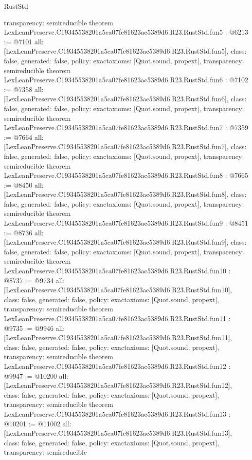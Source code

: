 \begin{lexlean}{RustStd}
\begin{coremodule}
{  transparency: semireducible
}
theorem LexLeanPreserve.C19345538201a5ca07fe81623ac5389d6.R23.RustStd.fun5 : @6213 := @7101 {
  all: [LexLeanPreserve.C19345538201a5ca07fe81623ac5389d6.R23.RustStd.fun5],
  class: false,
  generated: false,
  policy: exact{axioms: [Quot.sound, propext]},
  transparency: semireducible
}
theorem LexLeanPreserve.C19345538201a5ca07fe81623ac5389d6.R23.RustStd.fun6 : @7102 := @7358 {
  all: [LexLeanPreserve.C19345538201a5ca07fe81623ac5389d6.R23.RustStd.fun6],
  class: false,
  generated: false,
  policy: exact{axioms: [Quot.sound, propext]},
  transparency: semireducible
}
theorem LexLeanPreserve.C19345538201a5ca07fe81623ac5389d6.R23.RustStd.fun7 : @7359 := @7664 {
  all: [LexLeanPreserve.C19345538201a5ca07fe81623ac5389d6.R23.RustStd.fun7],
  class: false,
  generated: false,
  policy: exact{axioms: [Quot.sound, propext]},
  transparency: semireducible
}
theorem LexLeanPreserve.C19345538201a5ca07fe81623ac5389d6.R23.RustStd.fun8 : @7665 := @8450 {
  all: [LexLeanPreserve.C19345538201a5ca07fe81623ac5389d6.R23.RustStd.fun8],
  class: false,
  generated: false,
  policy: exact{axioms: [Quot.sound, propext]},
  transparency: semireducible
}
theorem LexLeanPreserve.C19345538201a5ca07fe81623ac5389d6.R23.RustStd.fun9 : @8451 := @8736 {
  all: [LexLeanPreserve.C19345538201a5ca07fe81623ac5389d6.R23.RustStd.fun9],
  class: false,
  generated: false,
  policy: exact{axioms: [Quot.sound, propext]},
  transparency: semireducible
}
theorem LexLeanPreserve.C19345538201a5ca07fe81623ac5389d6.R23.RustStd.fun10 : @8737 := @9734 {
  all: [LexLeanPreserve.C19345538201a5ca07fe81623ac5389d6.R23.RustStd.fun10],
  class: false,
  generated: false,
  policy: exact{axioms: [Quot.sound, propext]},
  transparency: semireducible
}
theorem LexLeanPreserve.C19345538201a5ca07fe81623ac5389d6.R23.RustStd.fun11 : @9735 := @9946 {
  all: [LexLeanPreserve.C19345538201a5ca07fe81623ac5389d6.R23.RustStd.fun11],
  class: false,
  generated: false,
  policy: exact{axioms: [Quot.sound, propext]},
  transparency: semireducible
}
theorem LexLeanPreserve.C19345538201a5ca07fe81623ac5389d6.R23.RustStd.fun12 : @9947 := @10200 {
  all: [LexLeanPreserve.C19345538201a5ca07fe81623ac5389d6.R23.RustStd.fun12],
  class: false,
  generated: false,
  policy: exact{axioms: [Quot.sound, propext]},
  transparency: semireducible
}
theorem LexLeanPreserve.C19345538201a5ca07fe81623ac5389d6.R23.RustStd.fun13 : @10201 := @11002 {
  all: [LexLeanPreserve.C19345538201a5ca07fe81623ac5389d6.R23.RustStd.fun13],
  class: false,
  generated: false,
  policy: exact{axioms: [Quot.sound, propext]},
  transparency: semireducible
}
\end{coremodule}
\end{lexlean}
